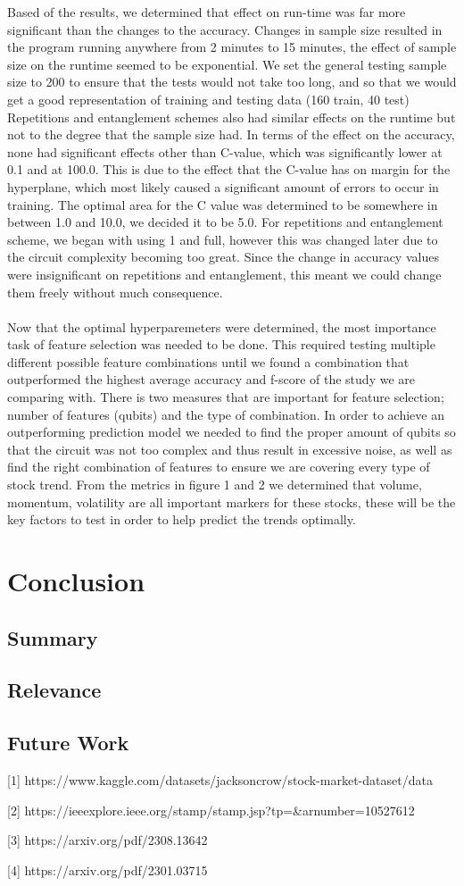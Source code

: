 \documentclass{article}
\begin{document}
\noindent
Based of the results, we determined that effect on run-time was far more significant than the changes to the accuracy. Changes in sample size resulted in the program running anywhere from 2 minutes to 15 minutes, the effect of sample size on the runtime seemed to be exponential. We set the general testing sample size to 200 to ensure that the tests would not take too long, and so that we would get a good representation of training and testing data (160 train, 40 test) Repetitions and entanglement schemes also had similar effects on the runtime but not to the degree that the sample size had. In terms of the effect on the accuracy, none had significant effects other than C-value, which was significantly lower at 0.1 and at 100.0. This is due to the effect that the C-value has on margin for the hyperplane, which most likely caused a significant amount of errors to occur in training. The optimal area for the C value was determined to be somewhere in between 1.0 and 10.0, we decided it to be 5.0. For repetitions and entanglement scheme, we began with using 1 and full, however this was changed later due to the circuit complexity becoming too great. Since the change in accuracy values were insignificant on repetitions and entanglement, this meant we could change them freely without much consequence. 
\\
\\
Now that the optimal hyperparemeters were determined, the most importance task of feature selection was needed to be done. This required testing multiple different possible feature combinations until we found a combination that outperformed the highest average accuracy and f-score of the study we are comparing with. There is two measures that are important for feature selection; number of features (qubits) and the type of combination. In order to achieve an outperforming prediction model we needed to find the proper amount of qubits so that the circuit was not too complex and thus result in excessive noise, as well as find the right combination of features to ensure we are covering every type of stock trend. From the metrics in figure 1 and 2 we determined that volume, momentum, volatility are all important markers for these stocks, these will be the key factors to test in order to help predict the trends optimally. 



\section*{Conclusion}
\subsection*{Summary}
\subsection*{Relevance}
\subsection*{Future Work}

[1] https://www.kaggle.com/datasets/jacksoncrow/stock-market-dataset/data

[2] https://ieeexplore.ieee.org/stamp/stamp.jsp?tp=\&arnumber=10527612

[3] https://arxiv.org/pdf/2308.13642

[4] https://arxiv.org/pdf/2301.03715
\end{document}
